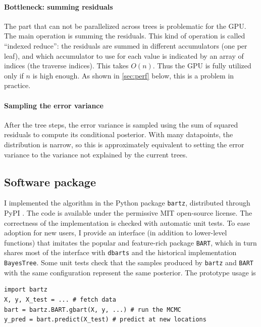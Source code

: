 \documentclass{article}
\begin{document}
    \paragraph{Bottleneck: summing residuals}

    The part that can not be parallelized across trees is problematic for the GPU. The main operation is summing the residuals. This kind of operation is called ``indexed reduce'': the residuals are summed in different accumulators (one per leaf), and which accumulator to use for each value is indicated by an array of indices (the traverse indices). This takes $O(n)$. Thus the GPU is fully utilized only if $n$ is high enough. As shown in \autoref{sec:perf} below, this is a problem in practice.

    \paragraph{Sampling the error variance}

    After the tree steps, the error variance is sampled using the sum of squared residuals to compute its conditional posterior. With many datapoints, the distribution is narrow, so this is approximately equivalent to setting the error variance to the variance not explained by the current trees.

    \subsection{Software package}

    I implemented the algorithm in the Python package \texttt{bartz}, distributed through PyPI \autocite{petrillo2024b}. The code is available under the permissive MIT open-source license. The correctness of the implementation is checked with automatic unit tests. To ease adoption for new users, I provide an interface (in addition to lower-level functions) that imitates the popular and feature-rich package \texttt{BART}, which in turn shares most of the interface with \texttt{dbarts} and the historical implementation \texttt{BayesTree}. Some unit tests check that the samples produced by \texttt{bartz} and \texttt{BART} with the same configuration represent the same posterior. The prototype usage is
    \lstset{
        language=Python,
        basicstyle=\ttfamily\small,
        commentstyle=\itshape,
    }
\begin{lstlisting}
import bartz
X, y, X_test = ... # fetch data
bart = bartz.BART.gbart(X, y, ...) # run the MCMC
y_pred = bart.predict(X_test) # predict at new locations
\end{lstlisting}
\end{document}

